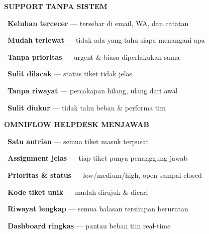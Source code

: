 \documentclass[a4paper]{article}
\begin{document}
\noindent
\begin{minipage}[t]{0.485\textwidth}
    \colorbox{RedLight}{%
        \begin{minipage}{\dimexpr\textwidth-2\fboxsep\relax}
            {\fontsize{10}{13}\selectfont\bfseries\color{RedText} SUPPORT TANPA SISTEM}
        \end{minipage}}\par
    \vspace{4pt}

    {\fontsize{9.5}{13}\selectfont\color{TextDark}%
    \textbullet\ \textbf{Keluhan tercecer} --- tersebar di email, WA, dan catatan\par\vspace{4pt}%
    \textbullet\ \textbf{Mudah terlewat} --- tidak ada yang tahu siapa menangani apa\par\vspace{4pt}%
    \textbullet\ \textbf{Tanpa prioritas} --- urgent \& biasa diperlakukan sama\par\vspace{4pt}%
    \textbullet\ \textbf{Sulit dilacak} --- status tiket tidak jelas\par\vspace{4pt}%
    \textbullet\ \textbf{Tanpa riwayat} --- percakapan hilang, ulang dari awal\par\vspace{4pt}%
    \textbullet\ \textbf{Sulit diukur} --- tidak tahu beban \& performa tim}%
\end{minipage}%
\hfill%
\begin{minipage}[t]{0.485\textwidth}
    \colorbox{BluePrimary}{%
        \begin{minipage}{\dimexpr\textwidth-2\fboxsep\relax}
            {\fontsize{10}{13}\selectfont\bfseries\color{White} OMNIFLOW HELPDESK MENJAWAB}
        \end{minipage}}\par
    \vspace{4pt}

    {\fontsize{9.5}{13}\selectfont\color{TextDark}%
    \textbullet\ \textbf{Satu antrian} --- semua tiket masuk terpusat\par\vspace{4pt}%
    \textbullet\ \textbf{Assignment jelas} --- tiap tiket punya penanggung jawab\par\vspace{4pt}%
    \textbullet\ \textbf{Prioritas \& status} --- low/medium/high, open sampai closed\par\vspace{4pt}%
    \textbullet\ \textbf{Kode tiket unik} --- mudah dirujuk \& dicari\par\vspace{4pt}%
    \textbullet\ \textbf{Riwayat lengkap} --- semua balasan tersimpan berurutan\par\vspace{4pt}%
    \textbullet\ \textbf{Dashboard ringkas} --- pantau beban tim real-time}%
\end{minipage}
\end{document}
